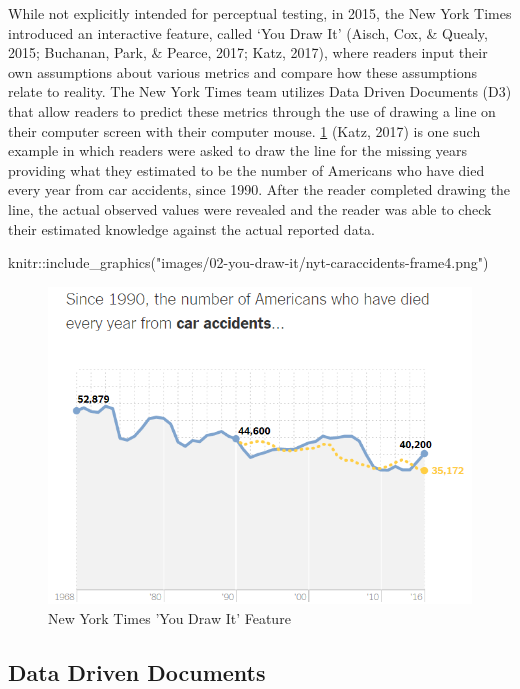 \documentclass[print]{nuthesis}
\newenvironment{Shaded}{\begin{snugshade}}{\end{snugshade}}
\newcommand{\FunctionTok}[1]{\textcolor[rgb]{0.00,0.00,0.00}{#1}}
\newcommand{\NormalTok}[1]{#1}
\newcommand{\SpecialCharTok}[1]{\textcolor[rgb]{0.00,0.00,0.00}{#1}}
\newcommand{\StringTok}[1]{\textcolor[rgb]{0.31,0.60,0.02}{#1}}
\begin{document}
While not explicitly intended for perceptual testing, in 2015, the New York Times introduced an interactive feature, called `You Draw It' (Aisch, Cox, \& Quealy, 2015; Buchanan, Park, \& Pearce, 2017; Katz, 2017), where readers input their own assumptions about various metrics and compare how these assumptions relate to reality.
The New York Times team utilizes Data Driven Documents (D3) that allow readers to predict these metrics through the use of drawing a line on their computer screen with their computer mouse.
\cref{fig:nyt-caraccidents} (Katz, 2017) is one such example in which readers were asked to draw the line for the missing years providing what they estimated to be the number of Americans who have died every year from car accidents, since 1990.
After the reader completed drawing the line, the actual observed values were revealed and the reader was able to check their estimated knowledge against the actual reported data.

\begin{Shaded}
\begin{Highlighting}[]
\NormalTok{knitr}\SpecialCharTok{::}\FunctionTok{include\_graphics}\NormalTok{(}\StringTok{"images/02{-}you{-}draw{-}it/nyt{-}caraccidents{-}frame4.png"}\NormalTok{)}
\end{Highlighting}
\end{Shaded}

\begin{figure}
\includegraphics[width=0.75\linewidth]{images/02-you-draw-it/nyt-caraccidents-frame4} \caption{New York Times 'You Draw It' Feature}\label{fig:nyt-caraccidents}
\end{figure}

\hypertarget{data-driven-documents}{%
\subsection{Data Driven Documents}\label{data-driven-documents}}
\end{document}
